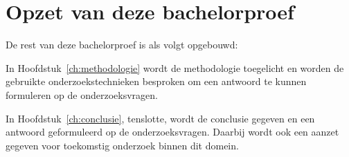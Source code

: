 
\section{Opzet van deze bachelorproef}
\label{sec:opzet-bachelorproef}


De rest van deze bachelorproef is als volgt opgebouwd:

In Hoofdstuk~\ref{ch:methodologie} wordt de methodologie toegelicht en worden de gebruikte onderzoekstechnieken besproken om een antwoord te kunnen formuleren op de onderzoeksvragen.


In Hoofdstuk~\ref{ch:conclusie}, tenslotte, wordt de conclusie gegeven en een antwoord geformuleerd op de onderzoeksvragen. Daarbij wordt ook een aanzet gegeven voor toekomstig onderzoek binnen dit domein.

